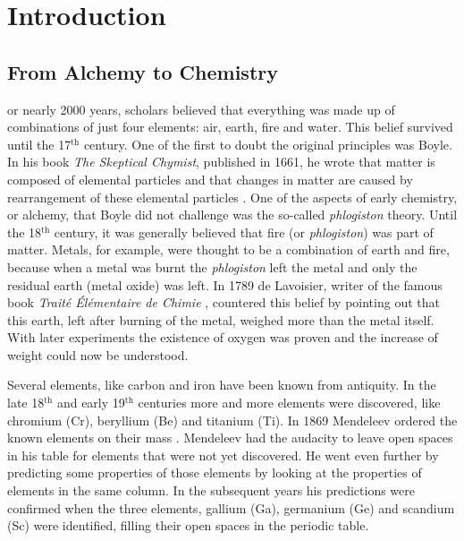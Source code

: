 \chapter{Introduction}
\label{chap_intro}

\newpage

\section{\label{ch1.sec.history1}From Alchemy to Chemistry}

\lettrine{}{}or nearly 2000 years, scholars believed that everything was made up of combinations of just four elements: air, earth, fire and water. This belief survived until the 17$^\mathrm{th}$ century. One of the first to doubt the original principles was Boyle. In his book \textit{The Skeptical Chymist}, published in 1661, he wrote that matter is composed of elemental particles and that changes in matter are caused by rearrangement of these elemental particles \cite{boyle}. One of the aspects of early chemistry, or alchemy, that Boyle did not challenge was the so-called \textit{phlogiston} theory. Until the 18$^\mathrm{th}$ century, it was generally believed that fire (or \textit{phlogiston}) was part of matter. Metals, for example, were thought to be a combination of earth and fire, because when a metal was burnt the \textit{phlogiston} left the metal and only the residual earth (metal oxide) was left. In 1789 de Lavoisier, writer of the famous book \textit{Trait\'e \'El\'ementaire de Chimie} \cite{lavoisier}, countered this belief by pointing out that this earth, left after burning of the metal, weighed more than the metal itself. With later experiments the existence of oxygen was proven and the increase of weight could now be understood.

Several elements, like carbon and iron have been known from antiquity. In the late 18$^\mathrm{th}$ and early 19$^\mathrm{th}$ centuries more and more elements were discovered, like chromium (Cr), beryllium (Be) and titanium (Ti).  In 1869 Mendeleev ordered the known elements on their mass \cite{mendeleev}. Mendeleev had the audacity to leave open spaces in his table for elements that were not yet discovered. He went even further by predicting some properties of those elements by looking at the properties of elements in the same column. In the subsequent years his predictions were confirmed when the three elements, gallium (Ga), germanium (Ge) and scandium (Sc) were identified, filling their open spaces in the periodic table.


